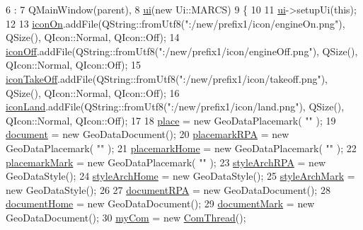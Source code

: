 \begin{DoxyCode}
6                             :
7     QMainWindow(parent),
8     \hyperlink{a00008_a6dc041ef6a2ffb329928d2913e8344e6}{ui}(\textcolor{keyword}{new} Ui::MARCS)
9 \{
10 
11     \hyperlink{a00008_a6dc041ef6a2ffb329928d2913e8344e6}{ui}->setupUi(\textcolor{keyword}{this});
12 
13     \hyperlink{a00008_afa3cdab37d8290f081abb0c5fb137230}{iconOn}.addFile(QString::fromUtf8(\textcolor{stringliteral}{":/new/prefix1/icon/engineOn.png"}), QSize(), QIcon::Normal, 
      QIcon::Off);
14     \hyperlink{a00008_a8b9cd945dedf4c271116b676b3ca723f}{iconOff}.addFile(QString::fromUtf8(\textcolor{stringliteral}{":/new/prefix1/icon/engineOff.png"}), QSize(), QIcon::Normal, 
      QIcon::Off);
15     \hyperlink{a00008_a0bf2452bb61d9523e3c8e53a28969dca}{iconTakeOff}.addFile(QString::fromUtf8(\textcolor{stringliteral}{":/new/prefix1/icon/takeoff.png"}), QSize(), 
      QIcon::Normal, QIcon::Off);
16     \hyperlink{a00008_a2f2a3f2df70bdcdde196ec849469359c}{iconLand}.addFile(QString::fromUtf8(\textcolor{stringliteral}{":/new/prefix1/icon/land.png"}), QSize(), QIcon::Normal, 
      QIcon::Off);
17 
18     \hyperlink{a00008_ab78e87803316b7303d0f8697c7c0f253}{place} =  \textcolor{keyword}{new} GeoDataPlacemark( \textcolor{stringliteral}{""} );
19     \hyperlink{a00008_a8b0f68f97ddd8c30ad31efa6919778ee}{document} = \textcolor{keyword}{new} GeoDataDocument();
20     \hyperlink{a00008_a5023376f47e503f88c7ee3bb2c096bb1}{placemarkRPA} = \textcolor{keyword}{new} GeoDataPlacemark( \textcolor{stringliteral}{""} );
21     \hyperlink{a00008_a5204b956a1ced61beed9e7db0e8289df}{placemarkHome} = \textcolor{keyword}{new} GeoDataPlacemark( \textcolor{stringliteral}{""} );
22     \hyperlink{a00008_a0e901909eecb8e5845b160761528be11}{placemarkMark} = \textcolor{keyword}{new} GeoDataPlacemark( \textcolor{stringliteral}{""} );
23     \hyperlink{a00008_a3ccaefd3393a3447a3a10d94ab67b0f9}{styleArchRPA} = \textcolor{keyword}{new} GeoDataStyle();
24     \hyperlink{a00008_a06e86babaf03affa3f647a3650df417e}{styleArchHome} = \textcolor{keyword}{new} GeoDataStyle();
25     \hyperlink{a00008_ab3cb2d82e21852d6e82932d21a1b3f41}{styleArchMark} = \textcolor{keyword}{new} GeoDataStyle();
26 
27     \hyperlink{a00008_ab48a9573e6326f95a2bd888734fa7827}{documentRPA} = \textcolor{keyword}{new} GeoDataDocument();
28     \hyperlink{a00008_a5485f3186e5ee43d5cb40af7a555bb7e}{documentHome} = \textcolor{keyword}{new} GeoDataDocument();
29     \hyperlink{a00008_a9480c34bf64d45bdea5c4d162eb2bfd4}{documentMark} = \textcolor{keyword}{new} GeoDataDocument();
30     \hyperlink{a00008_a92b8cb43df3f03b62d33cd4e04550941}{myCom} = \textcolor{keyword}{new} \hyperlink{a00002}{ComThread}();

\end{DoxyCode}
